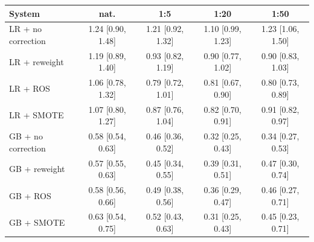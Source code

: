 \begin{tabular}{lcccc}
\toprule
System & nat. & 1:5 & 1:20 & 1:50 \\
\midrule
LR + no correction & 1.24 [0.90, 1.48] & 1.21 [0.92, 1.32] & 1.10 [0.99, 1.23] & 1.23 [1.06, 1.50] \\
LR + reweight & 1.19 [0.89, 1.40] & 0.93 [0.82, 1.19] & 0.90 [0.77, 1.02] & 0.90 [0.83, 1.03] \\
LR + ROS & 1.06 [0.78, 1.32] & 0.79 [0.72, 1.01] & 0.81 [0.67, 0.90] & 0.80 [0.73, 0.89] \\
LR + SMOTE & 1.07 [0.80, 1.27] & 0.87 [0.76, 1.04] & 0.82 [0.70, 0.91] & 0.91 [0.82, 0.97] \\
GB + no correction & 0.58 [0.54, 0.63] & 0.46 [0.36, 0.52] & 0.32 [0.25, 0.43] & 0.34 [0.27, 0.53] \\
GB + reweight & 0.57 [0.55, 0.63] & 0.45 [0.34, 0.55] & 0.39 [0.31, 0.51] & 0.47 [0.30, 0.74] \\
GB + ROS & 0.58 [0.56, 0.66] & 0.49 [0.38, 0.56] & 0.36 [0.29, 0.47] & 0.46 [0.27, 0.71] \\
GB + SMOTE & 0.63 [0.54, 0.75] & 0.52 [0.43, 0.63] & 0.31 [0.25, 0.43] & 0.45 [0.23, 0.71] \\
\bottomrule
\end{tabular}